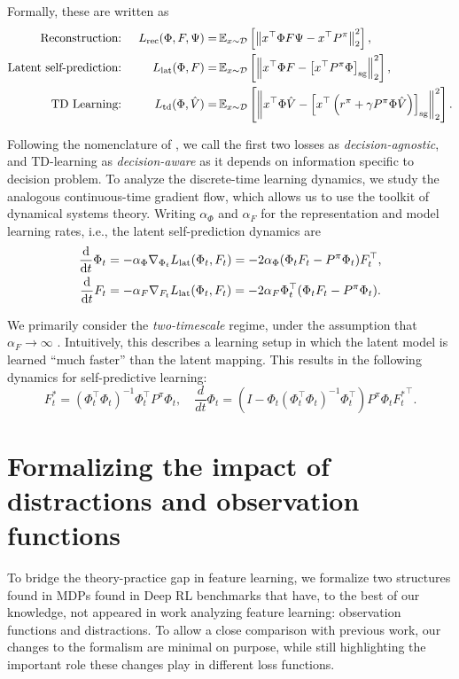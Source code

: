 Formally, these are written as
\begin{align*}
    \text{Reconstruction: }&& L_{\text{rec}}(\Phi,F,\Psi) =& \,\mathbb{E}_{x \sim \mathcal{D}}\left[  \left\lVert x^\top \Phi F \Psi - x^\top {P^\pi} \right\rVert_2^2 \right],\\
    \text{Latent self-prediction: }&& L_{\text{lat}}(\Phi,F) =& \,\mathbb{E}_{x \sim \mathcal{D}}\left[  \left\lVert x^\top \Phi F - \left[x^\top {P^\pi} \Phi\right]_{\mathrm{sg}} \right\rVert_2^2 \right], \\
    \text{TD Learning: }&& L_{\text{td}}(\Phi,\hat{V}) =& \,\mathbb{E}_{x \sim \mathcal{D}}\left[  \left\lVert x^\top \Phi \hat{V} - \left[x^\top  \left(r^\pi + \gamma P^\pi \Phi \hat{V}\right)\right]_{\mathrm{sg}} \right\rVert_2^2 \right].
\end{align*}

Following the nomenclature of \textcite{vaml}, we call the first two losses as \emph{decision-agnostic}, and TD-learning as \emph{decision-aware} as it depends on information specific to decision problem.
To analyze the discrete-time learning dynamics, we study the analogous continuous-time gradient flow, which allows us to use the toolkit of dynamical systems theory.
Writing $\alpha_\Phi$ and $\alpha_F$ for the representation and model learning rates, i.e., the latent self-prediction dynamics are
\begin{align*}
    \frac{\mathrm{d}}{\mathrm{d} t} \Phi_t &= -\alpha_\Phi\nabla_{\Phi_t} {L}_{\text{lat}}(\Phi_t, F_t) = -2 \alpha_\Phi (\Phi_t F_t - P^\pi \Phi_t)  F_t^\top,\\
    \frac{\mathrm{d}}{\mathrm{d} t} F_t  &= -\alpha_F\nabla_{F_t} {L}_{\text{lat}}(\Phi_t, F_t) = -2 \alpha_F \Phi_t^\top(\Phi_t F_t - P^\pi \Phi_t).
\end{align*}

We primarily consider the \emph{two-timescale} regime, under the assumption that $\alpha_F\to \infty$ \parencite{tang2022understanding}. Intuitively, this describes a learning setup in which the latent model is learned ``much faster'' than the latent mapping. 
This results in the following dynamics for self-predictive learning:
\begin{equation}
    \label{eq:BYOLTwoTimescale}
    F_t^* = \left(\Phi_t^\top\Phi_t\right)^{-1} \Phi_t^\top P^\pi \Phi_t, \quad \frac{d}{dt}\Phi_t = \left(I-\Phi_t\left(\Phi_t^\top \Phi_t\right)^{-1}\Phi_t^\top\right)P^\pi \Phi_t {F_t^*}^\top.
\end{equation}

\section{Formalizing the impact of distractions and observation functions}
\label{sec:formalism}
To bridge the theory-practice gap in feature learning, we formalize two structures found in MDPs found in Deep RL benchmarks that have, to the best of our knowledge, not appeared in work analyzing feature learning: observation functions and distractions.
To allow a close comparison with previous work, our changes to the formalism are minimal on purpose, while still highlighting the important role these changes play in different loss functions.

